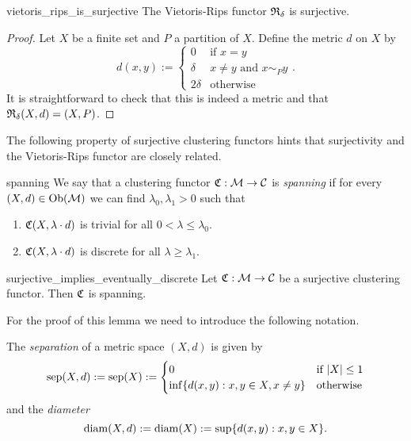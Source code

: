 \begin{proposition}{\cite[Rem.~6.1]{Carlsson2010}}{vietoris_rips_is_surjective}
    The Vietoris-Rips functor $\mathfrak{R}_\delta$ is surjective.
\end{proposition}
\begin{proof}
Let $X$ be a finite set and $P$ a partition of $X$. Define the metric $d$ on $X$ by
\begin{equation*}
    d(x,y) := \begin{cases}
        0 & \text{if } x = y\\
        \delta & x \neq y \text{ and } x \sim_P y\\
        2\delta & \text{otherwise}
    \end{cases}.
\end{equation*}
It is straightforward to check that this is indeed a metric and that $\mathfrak{R}_\delta(X,d) = (X,P)$.
\end{proof}

The following property of surjective clustering functors hints that surjectivity and the Vietoris-Rips functor are closely related.


\begin{definition}{}{spanning}
    We say that a clustering functor $\mathfrak{C}: \mathcal{M} \to \mathcal{C}$ is \emph{spanning} if for every $(X,d) \in \mathrm {Ob}(\mathcal{M})$ we can find $\lambda_0, \lambda_1 > 0$ such that
    \begin{enumerate}
        \item $\mathfrak{C}(X,\lambda \cdot d)$ is trivial for all $0 < \lambda \le \lambda_0$.
        \item $\mathfrak{C}(X,\lambda \cdot d)$ is discrete for all $\lambda \ge \lambda_1$.
    \end{enumerate}
\end{definition}

\begin{lemma}{}{surjective_implies_eventually_discrete}
    Let $\mathfrak{C}: \mathcal{M} \to \mathcal{C}$ be a surjective clustering functor. Then $\mathfrak{C}$ is spanning.
\end{lemma}

For the proof of this lemma we need to introduce the following notation.

\begin{definition}{}{}
    The \emph{separation} of a metric space $(X,d)$ is given by
    \begin{equation*}
    \mathrm{sep}(X,d) := \mathrm{sep}(X) := \begin{cases}
        0 & \text{if } |X| \le 1\\
        \inf\{d(x,y): x,y \in X, x \neq y\} & \text{otherwise}
    \end{cases}
    \end{equation*}
    and the \emph{diameter}
    \begin{equation*}
    \mathrm{diam}(X,d) := \mathrm{diam}(X) := \sup\{d(x,y): x,y \in X\}.
    \end{equation*}
\end{definition}

